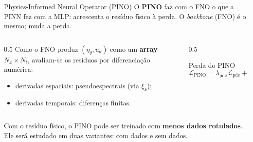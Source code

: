 \begin{frame}{Physics-Informed Neural Operator (PINO)}
  O \textbf{PINO} \parencite{li2023pino} faz com o FNO o que a PINN fez com a MLP: acrescenta
  o \alert{resíduo físico à perda}. O \emph{backbone} (FNO) é o mesmo; muda a perda.

  \begin{columns}[T,totalwidth=\textwidth]
    \begin{column}{0.5\textwidth}
      \footnotesize
      Como o FNO produz $(\eta_\theta,u_\theta)$ como um \textbf{array} $N_x\times N_t$,
      avaliam-se os resíduos por diferenciação numérica:
      \begin{itemize}
        \item derivadas \alert{espaciais}: pseudoespectrais (via $\xi_k$);
        \item derivadas \alert{temporais}: diferenças finitas.
      \end{itemize}
    \end{column}
    \begin{column}{0.5\textwidth}
      \begin{block}{Perda do PINO}
        \footnotesize
        \begin{equation*}
          \mathcal{L}_{\text{PINO}} = \lambda_{\text{pde}}\mathcal{L}_{\text{pde}}
          + \lambda_{\text{ic}}\mathcal{L}_{\text{ic}}
          + \lambda_{\text{data}}\mathcal{L}_{\text{data}}.
        \end{equation*}
      \end{block}
    \end{column}
  \end{columns}

  \vspace{0.1cm}
  \begin{information}
    Com o resíduo físico, o PINO pode ser treinado com \textbf{menos dados rotulados}. Ele
    será estudado em duas variantes: \alert{com dados} e \alert{sem dados}.
  \end{information}
\end{frame}
